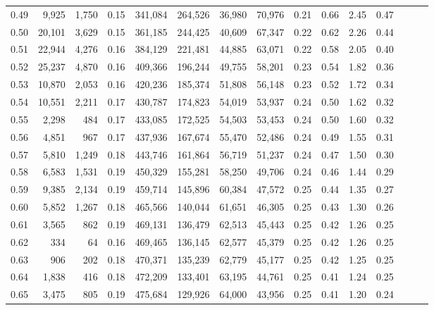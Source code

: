 \begin{tabular}{rrrrrrrrrrrrrrr}
0.49 &   9,925 &  1,750 &  0.15 &  341,084 &  264,526 &   36,980 &   70,976 &  0.21 &  0.66 &  2.45 &      0.47 \\
0.50 &  20,101 &  3,629 &  0.15 &  361,185 &  244,425 &   40,609 &   67,347 &  0.22 &  0.62 &  2.26 &      0.44 \\
0.51 &  22,944 &  4,276 &  0.16 &  384,129 &  221,481 &   44,885 &   63,071 &  0.22 &  0.58 &  2.05 &      0.40 \\
0.52 &  25,237 &  4,870 &  0.16 &  409,366 &  196,244 &   49,755 &   58,201 &  0.23 &  0.54 &  1.82 &      0.36 \\
0.53 &  10,870 &  2,053 &  0.16 &  420,236 &  185,374 &   51,808 &   56,148 &  0.23 &  0.52 &  1.72 &      0.34 \\
0.54 &  10,551 &  2,211 &  0.17 &  430,787 &  174,823 &   54,019 &   53,937 &  0.24 &  0.50 &  1.62 &      0.32 \\
0.55 &   2,298 &    484 &  0.17 &  433,085 &  172,525 &   54,503 &   53,453 &  0.24 &  0.50 &  1.60 &      0.32 \\
0.56 &   4,851 &    967 &  0.17 &  437,936 &  167,674 &   55,470 &   52,486 &  0.24 &  0.49 &  1.55 &      0.31 \\
0.57 &   5,810 &  1,249 &  0.18 &  443,746 &  161,864 &   56,719 &   51,237 &  0.24 &  0.47 &  1.50 &      0.30 \\
0.58 &   6,583 &  1,531 &  0.19 &  450,329 &  155,281 &   58,250 &   49,706 &  0.24 &  0.46 &  1.44 &      0.29 \\
0.59 &   9,385 &  2,134 &  0.19 &  459,714 &  145,896 &   60,384 &   47,572 &  0.25 &  0.44 &  1.35 &      0.27 \\
0.60 &   5,852 &  1,267 &  0.18 &  465,566 &  140,044 &   61,651 &   46,305 &  0.25 &  0.43 &  1.30 &      0.26 \\
0.61 &   3,565 &    862 &  0.19 &  469,131 &  136,479 &   62,513 &   45,443 &  0.25 &  0.42 &  1.26 &      0.25 \\
0.62 &     334 &     64 &  0.16 &  469,465 &  136,145 &   62,577 &   45,379 &  0.25 &  0.42 &  1.26 &      0.25 \\
0.63 &     906 &    202 &  0.18 &  470,371 &  135,239 &   62,779 &   45,177 &  0.25 &  0.42 &  1.25 &      0.25 \\
0.64 &   1,838 &    416 &  0.18 &  472,209 &  133,401 &   63,195 &   44,761 &  0.25 &  0.41 &  1.24 &      0.25 \\
0.65 &   3,475 &    805 &  0.19 &  475,684 &  129,926 &   64,000 &   43,956 &  0.25 &  0.41 &  1.20 &      0.24 \\

\end{tabular}
